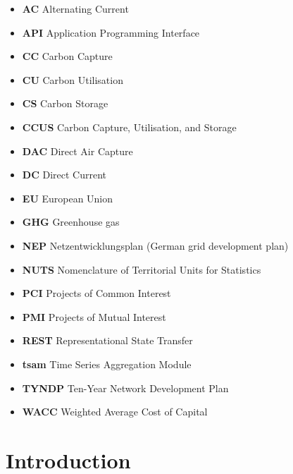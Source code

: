 \documentclass[preprint,12pt,sort&compress]{elsarticle}
\begin{document}
\begin{itemize}[left=0pt, label={}, itemsep=0pt, parsep=0pt, topsep=0pt]
  \item \textbf{AC} \enspace Alternating Current
  \item \textbf{API} \enspace Application Programming Interface
  \item \textbf{CC} \enspace Carbon Capture
  \item \textbf{CU} \enspace Carbon Utilisation
  \item \textbf{CS} \enspace Carbon Storage
  \item \textbf{CCUS} \enspace Carbon Capture, Utilisation, and Storage
  \item \textbf{DAC} \enspace Direct Air Capture
  \item \textbf{DC} \enspace Direct Current
  \item \textbf{EU} \enspace European Union
  \item \textbf{GHG} \enspace Greenhouse gas
  \item \textbf{NEP} \enspace Netzentwicklungsplan (German grid development plan)
  \item \textbf{NUTS} \enspace Nomenclature of Territorial Units for Statistics
  \item \textbf{PCI} \enspace Projects of Common Interest
  \item \textbf{PMI} \enspace Projects of Mutual Interest
  \item \textbf{REST} \enspace Representational State Transfer 
  \item \textbf{tsam} \enspace Time Series Aggregation Module
  \item \textbf{TYNDP} \enspace Ten-Year Network Development Plan
  \item \textbf{WACC} \enspace Weighted Average Cost of Capital

\end{itemize}

\section{Introduction}
\label{sec:introduction}
\end{document}
